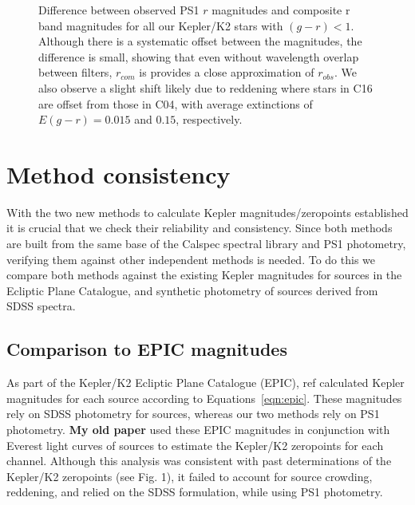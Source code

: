 \documentclass{aastex63}
\begin{document}
\begin{figure}
    \caption{Difference between observed PS1 $r$ magnitudes and composite r band magnitudes for all our Kepler/K2 stars with $(g-r)<1$. Although there is a systematic offset between the magnitudes, the difference is small, showing that even without wavelength overlap between filters, $r_{com}$ is provides a close approximation of $r_{obs}$. We also observe a slight shift likely due to reddening where stars in C16 are offset from those in C04, with average extinctions of $E(g-r)=0.015$ and $0.15$, respectively. }
    \label{fig:robs_vs_rcom}
\end{figure}




\section{Method consistency}

With the two new methods to calculate Kepler magnitudes/zeropoints established it is crucial that we check their reliability and consistency. Since both methods are built from the same base of the Calspec spectral library and PS1 photometry, verifying them against other independent methods is needed. To do this we compare both methods against the existing Kepler magnitudes for sources in the Ecliptic Plane Catalogue, and synthetic photometry of sources derived from SDSS spectra.

\subsection{Comparison to EPIC magnitudes}
As part of the Kepler/K2 Ecliptic Plane Catalogue (EPIC), ref calculated Kepler magnitudes for each source according to Equations~\ref{eqn:epic}. These magnitudes rely on SDSS photometry for sources, whereas our two methods rely on PS1 photometry. \textbf{My old paper} used these EPIC magnitudes in conjunction with Everest light curves of sources to estimate the Kepler/K2 zeropoints for each channel. Although this analysis was consistent with past determinations of the Kepler/K2 zeropoints (see Fig. 1), it failed to account for source crowding, reddening, and relied on the SDSS formulation, while using PS1 photometry. 
\end{document}
